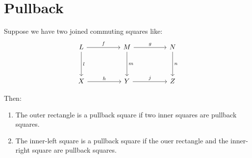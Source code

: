 \documentclass[./main.tex]{subfiles}
\begin{document}
\section{Pullback}

\begin{theorem}
  Suppose we have two joined commuting squares like:
  \[\begin{tikzcd}
    L && M && N \\
    \\
    X && Y && Z
    \arrow["f", from=1-1, to=1-3]
    \arrow["l", from=1-1, to=3-1]
    \arrow["g", from=1-3, to=1-5]
    \arrow["m", from=1-3, to=3-3]
    \arrow["n", from=1-5, to=3-5]
    \arrow["h", from=3-1, to=3-3]
    \arrow["j", from=3-3, to=3-5]
  \end{tikzcd}\]

  Then:
  \begin{enumerate}
    \item The outer rectangle is a pullback square if two inner squares are pullback squares.
    \item The inner-left square is a pullback square if the ouer rectangle and the inner-right square are pullback squares.
  \end{enumerate}
\end{theorem}
\end{document}

